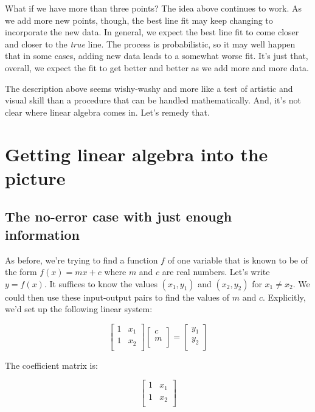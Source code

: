 \documentclass[10pt]{amsart}
\begin{document}
What if we have more than three points? The idea above continues to
work. As we add more new points, though, the best line fit may keep
changing to incorporate the new data. In general, we expect the best
line fit to come closer and closer to the {\em true} line. The process
is probabilistic, so it may well happen that in some cases, adding new
data leads to a somewhat worse fit. It's just that, overall, we expect
the fit to get better and better as we add more and more data.

The description above seems wishy-washy and more like a test of
artistic and visual skill than a procedure that can be handled
mathematically. And, it's not clear where linear algebra comes
in. Let's remedy that.

\section{Getting linear algebra into the picture}

\subsection{The no-error case with just enough information}

As before, we're trying to find a function $f$ of one variable that is
known to be of the form $f(x) = mx + c$ where $m$ and $c$ are real
numbers. Let's write $y = f(x)$. It suffices to know the values
$(x_1,y_1)$ and $(x_2,y_2)$ for $x_1 \ne x_2$. We could then use these
input-output pairs to find the values of $m$ and $c$. Explicitly, we'd
set up the following linear system:

$$\left[\begin{matrix} 1 & x_1\\ 1 & x_2 \\\end{matrix}\right]\left[\begin{matrix} c \\ m \\\end{matrix}\right] = \left[\begin{matrix} y_1 \\ y_2 \\\end{matrix}\right]$$

The coefficient matrix is:

$$\left[\begin{matrix} 1 & x_1  \\ 1 & x_2 \\\end{matrix}\right]$$
\end{document}
